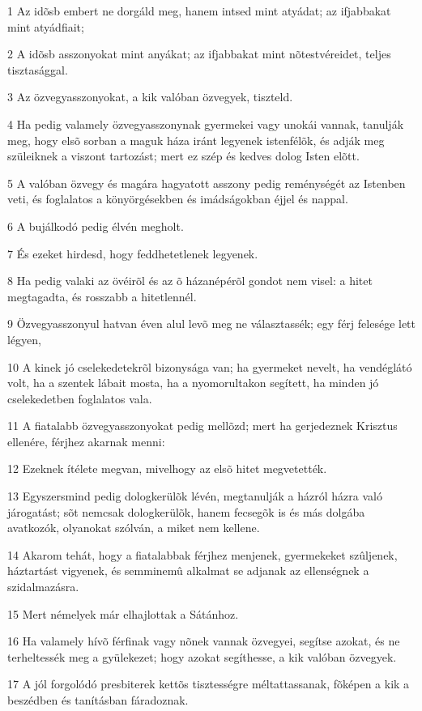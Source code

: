 \par 1 Az idõsb embert ne dorgáld meg, hanem intsed mint atyádat; az ifjabbakat mint atyádfiait;
\par 2 A idõsb asszonyokat mint anyákat; az ifjabbakat mint nõtestvéreidet, teljes tisztasággal.
\par 3 Az özvegyasszonyokat, a kik valóban özvegyek, tiszteld.
\par 4 Ha pedig valamely özvegyasszonynak gyermekei vagy unokái vannak, tanulják meg, hogy elsõ sorban a maguk háza iránt legyenek istenfélõk, és adják meg szüleiknek a viszont tartozást; mert ez szép és kedves dolog Isten elõtt.
\par 5 A valóban özvegy és magára hagyatott asszony pedig reménységét az Istenben veti, és foglalatos a könyörgésekben és imádságokban éjjel és nappal.
\par 6 A bujálkodó pedig élvén megholt.
\par 7 És ezeket hirdesd, hogy feddhetetlenek legyenek.
\par 8 Ha pedig valaki az övéirõl és az õ házanépérõl gondot nem visel: a hitet megtagadta, és rosszabb a hitetlennél.
\par 9 Özvegyasszonyul hatvan éven alul levõ meg ne választassék; egy férj felesége lett légyen,
\par 10 A kinek jó cselekedetekrõl bizonysága van; ha gyermeket nevelt, ha vendéglátó volt, ha a szentek lábait mosta, ha a nyomorultakon segített, ha minden jó cselekedetben foglalatos vala.
\par 11 A fiatalabb özvegyasszonyokat pedig mellõzd; mert ha gerjedeznek Krisztus ellenére, férjhez akarnak menni:
\par 12 Ezeknek ítélete megvan, mivelhogy az elsõ hitet megvetették.
\par 13 Egyszersmind pedig dologkerülõk lévén, megtanulják a házról házra való járogatást; sõt nemcsak dologkerülõk, hanem fecsegõk is és más dolgába avatkozók, olyanokat szólván, a miket nem kellene.
\par 14 Akarom tehát, hogy a fiatalabbak férjhez menjenek, gyermekeket szûljenek, háztartást vigyenek, és semminemû alkalmat se adjanak az ellenségnek a szidalmazásra.
\par 15 Mert némelyek már elhajlottak a Sátánhoz.
\par 16 Ha valamely hívõ férfinak vagy nõnek vannak özvegyei, segítse azokat, és ne terheltessék meg a gyülekezet; hogy azokat segíthesse, a kik valóban özvegyek.
\par 17 A jól forgolódó presbiterek kettõs tisztességre méltattassanak, fõképen a kik a beszédben és tanításban fáradoznak.
